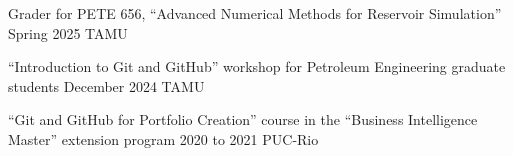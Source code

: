
\cvteaching
    {Grader for PETE 656, ``Advanced Numerical Methods for Reservoir Simulation''}
    {Spring 2025}
    {TAMU}

\cvteaching
    {``Introduction to Git and GitHub'' workshop for Petroleum Engineering graduate students}
    {December 2024}
    {TAMU}

\cvteaching
    {``Git and GitHub for Portfolio Creation'' course in the ``Business Intelligence Master'' extension program}
    {2020 to 2021}
    {PUC-Rio}
